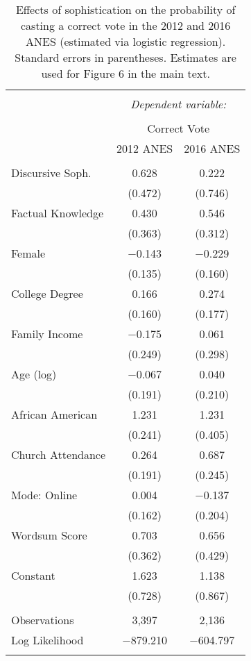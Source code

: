 
\begin{table}[!htbp] \centering 
  \caption{Effects of sophistication on the probability of casting a correct vote in the 
          2012 and 2016 ANES (estimated via logistic regression). Standard errors in parentheses.
          Estimates are used for Figure 6 in the main text.} 
  \label{tab:correctvote} 
\begin{tabular}{@{\extracolsep{0pt}}lcc} 
\\[-1.8ex]\hline 
\hline \\[-1.8ex] 
 & \multicolumn{2}{c}{\textit{Dependent variable:}} \\ 
\cline{2-3} 
\\[-1.8ex] & \multicolumn{2}{c}{Correct Vote} \\ 
 & 2012 ANES & 2016 ANES \\ 
\hline \\[-1.8ex] 
 Discursive Soph. & 0.628 & 0.222 \\ 
  & (0.472) & (0.746) \\ 
  Factual Knowledge & 0.430 & 0.546 \\ 
  & (0.363) & (0.312) \\ 
  Female & $-$0.143 & $-$0.229 \\ 
  & (0.135) & (0.160) \\ 
  College Degree & 0.166 & 0.274 \\ 
  & (0.160) & (0.177) \\ 
  Family Income & $-$0.175 & 0.061 \\ 
  & (0.249) & (0.298) \\ 
  Age (log) & $-$0.067 & 0.040 \\ 
  & (0.191) & (0.210) \\ 
  African American & 1.231 & 1.231 \\ 
  & (0.241) & (0.405) \\ 
  Church Attendance & 0.264 & 0.687 \\ 
  & (0.191) & (0.245) \\ 
  Mode: Online & 0.004 & $-$0.137 \\ 
  & (0.162) & (0.204) \\ 
  Wordsum Score & 0.703 & 0.656 \\ 
  & (0.362) & (0.429) \\ 
  Constant & 1.623 & 1.138 \\ 
  & (0.728) & (0.867) \\ 
 \hline \\[-1.8ex] 
Observations & 3,397 & 2,136 \\ 
Log Likelihood & $-$879.210 & $-$604.797 \\ 
\hline 
\hline \\[-1.8ex] 
\end{tabular} 
\end{table} 
